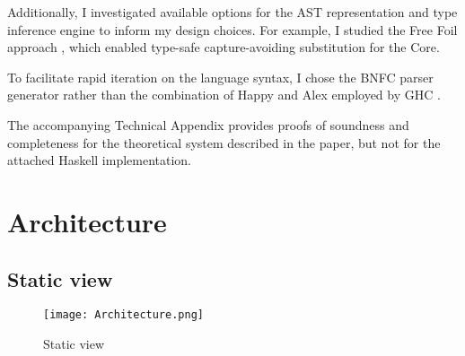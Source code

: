 Additionally, I investigated available options for the AST representation and type inference engine to inform my design choices. For example, I studied the Free Foil approach \cite{kudasov-free-2024}, which enabled type-safe capture-avoiding substitution for the Core.

To facilitate rapid iteration on the language syntax, I chose the BNFC parser generator \cite{bnfc-parser-generator} rather than the combination of Happy and Alex employed by GHC \cite{ghc-gitlab-2025}.

The accompanying Technical Appendix \cite{practical-type-inference-proofs} provides proofs of soundness and completeness for the theoretical system described in the paper, but not for the attached Haskell implementation.









\section{Architecture}
\label{chap:DesignImplementation:sec:Architecture}

\subsection{Static view}

\newpage

\begin{figure}[h]
  \centering
  \texttt{[image: Architecture.png]}
  \caption{Static view}
  \label{Architecture}
\end{figure}

